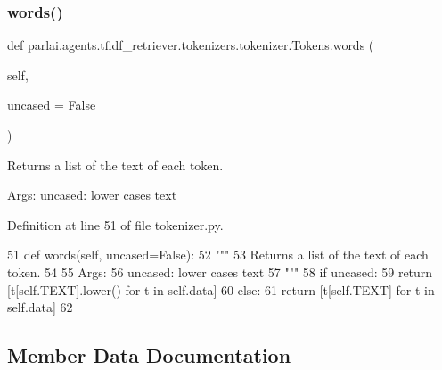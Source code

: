 \subsubsection{\texorpdfstring{words()}{words()}}
{\footnotesize\ttfamily def parlai.\+agents.\+tfidf\+\_\+retriever.\+tokenizers.\+tokenizer.\+Tokens.\+words (\begin{DoxyParamCaption}\item[{}]{self,  }\item[{}]{uncased = {\ttfamily False} }\end{DoxyParamCaption})}

\begin{DoxyVerb}Returns a list of the text of each token.

Args:
    uncased: lower cases text
\end{DoxyVerb}
 

Definition at line 51 of file tokenizer.\+py.


\begin{DoxyCode}
51     \textcolor{keyword}{def }words(self, uncased=False):
52         \textcolor{stringliteral}{"""}
53 \textcolor{stringliteral}{        Returns a list of the text of each token.}
54 \textcolor{stringliteral}{}
55 \textcolor{stringliteral}{        Args:}
56 \textcolor{stringliteral}{            uncased: lower cases text}
57 \textcolor{stringliteral}{        """}
58         \textcolor{keywordflow}{if} uncased:
59             \textcolor{keywordflow}{return} [t[self.TEXT].lower() \textcolor{keywordflow}{for} t \textcolor{keywordflow}{in} self.data]
60         \textcolor{keywordflow}{else}:
61             \textcolor{keywordflow}{return} [t[self.TEXT] \textcolor{keywordflow}{for} t \textcolor{keywordflow}{in} self.data]
62 
\end{DoxyCode}


\subsection{Member Data Documentation}
\mbox{\label{classparlai_1_1agents_1_1tfidf__retriever_1_1tokenizers_1_1tokenizer_1_1Tokens_a394834203475385444a933440dcdd026}} 
